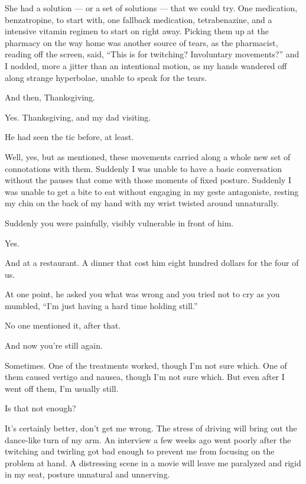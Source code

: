 She had a solution --- or a set of solutions --- that we could try. One medication, benzatropine, to start with, one fallback medication, tetrabenazine, and a intensive vitamin regimen to start on right away. Picking them up at the pharmacy on the way home was another source of tears, as the pharmacist, reading off the screen, said, ``This is for twitching? Involuntary movements?'' and I nodded, more a jitter than an intentional motion, as my hands wandered off along strange hyperbolae, unable to speak for the tears.

\begin{ally}
And then, Thanksgiving.
\end{ally}
Yes. Thanksgiving, and my dad visiting.

\begin{ally}
He had seen the tic before, at least.
\end{ally}
Well, yes, but as mentioned, these movements carried along a whole new set of connotations with them. Suddenly I was unable to have a basic conversation without the pauses that come with those moments of fixed posture. Suddenly I was unable to get a bite to eat without engaging in my geste antagoniste, resting my chin on the back of my hand with my wrist twisted around unnaturally.

\begin{ally}
Suddenly you were painfully, visibly vulnerable in front of him.
\end{ally}
Yes.

And at a restaurant. A dinner that cost him eight hundred dollars for the four of us.

\begin{ally}
At one point, he asked you what was wrong and you tried not to cry as you mumbled, ``I'm just having a hard time holding still.''
\end{ally}
No one mentioned it, after that.
\newpage

\begin{ally}
And now you're still again.
\end{ally}
Sometimes. One of the treatments worked, though I'm not sure which. One of them caused vertigo and nausea, though I'm not sure which. But even after I went off them, I'm usually still.

\begin{ally}
Is that not enough?
\end{ally}
It's certainly better, don't get me wrong. The stress of driving will bring out the dance-like turn of my arm. An interview a few weeks ago went poorly after the twitching and twirling got bad enough to prevent me from focusing on the problem at hand. A distressing scene in a movie will leave me paralyzed and rigid in my seat, posture unnatural and unnerving.

